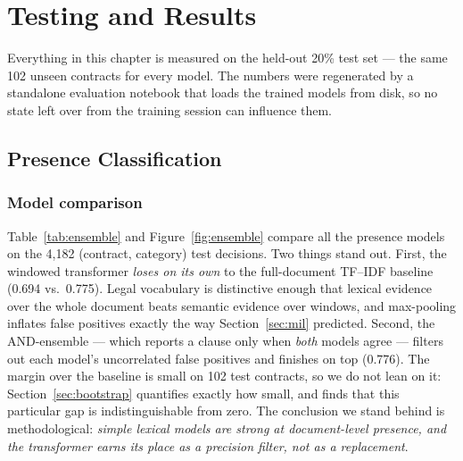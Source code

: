 \chapter{Testing and Results}

Everything in this chapter is measured on the held-out 20\% test set --- the same 102 unseen contracts for every model. The numbers were regenerated by a standalone evaluation notebook that loads the trained models from disk, so no state left over from the training session can influence them.

\section{Presence Classification}

\subsection{Model comparison}
Table~\ref{tab:ensemble} and Figure~\ref{fig:ensemble} compare all the presence models on the 4{,}182 (contract, category) test decisions. Two things stand out. First, the windowed transformer \emph{loses on its own} to the full-document TF--IDF baseline (0.694 vs.\ 0.775). Legal vocabulary is distinctive enough that lexical evidence over the whole document beats semantic evidence over windows, and max-pooling inflates false positives exactly the way Section~\ref{sec:mil} predicted. Second, the AND-ensemble --- which reports a clause only when \emph{both} models agree --- filters out each model's uncorrelated false positives and finishes on top (0.776). The margin over the baseline is small on 102 test contracts, so we do not lean on it: Section~\ref{sec:bootstrap} quantifies exactly how small, and finds that this particular gap is indistinguishable from zero. The conclusion we stand behind is methodological: \emph{simple lexical models are strong at document-level presence, and the transformer earns its place as a precision filter, not as a replacement}.

